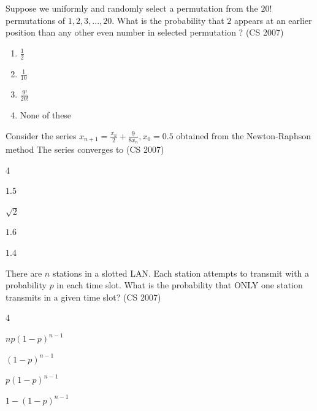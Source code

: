 \item Suppose we uniformly and randomly select a permutation from the $20!$ permutations of $1,2,3,...,20.$ What is the probability that $2$ appears at an earlier position than any other even number  in selected permutation ?
\hfill {(CS 2007)}
\begin{enumerate}
    \item $\frac{1}{2}$   

    \item $\frac{1}{10}$

    \item $\frac{9!}{20!}$
  
    \item None of these
\end{enumerate}
    \item Consider the series $x_{n+1}=\frac{x_n}{2}+\frac{9}{8x_n},x_0=0.5$ obtained from the Newton-Raphson method The series converges to
    \hfill {(CS 2007)}
    \begin{enumerate}
        \begin{multicols}{4}
        \item $1.5$
        \item $\sqrt{2}$
        \item $1.6$
        \item $1.4$
         \end{multicols}
    \end{enumerate}
    \item There are $n$ stations in a slotted LAN. Each station attempts to transmit with a probability $p$ in each time slot. What is the probability that {ONLY} one station transmits in a given time slot?  
\hfill {(CS 2007)}
    \begin{enumerate}
    \begin{multicols}{4}
        \item $np(1-p)^{n-1}$
        \item $(1-p)^{n-1}$
        \item $p(1-p)^{n-1}$
        \item $1 - (1-p)^{n-1}$
        \end{multicols}
    \end{enumerate}

